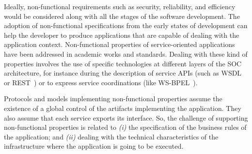 Ideally, non-functional requirements such as
security, reliability, and efficiency
would be considered along with all the stages of the software development. The
adoption of non-functional specifications from the early states of development
can help the developer to produce applications that are capable of dealing with
the application context.
%
%
Non-functional properties of service-oriented applications  have been
addressed in academic works and standards. %
Dealing with these kind of properties involves the use of specific technologies
at different layers of the SOC architecture, for instance during the description
of service APIs (such as WSDL\cite{wsdl} or REST~\cite{rest}) or to express
service coordinations (like WS-BPEL~\cite{bpel03}).


Protocols and models implementing non-functional properties assume the existence of a global control of the artifacts implementing the application.
They also assume that each service exports its interface.
So, the challenge of supporting non-functional properties is related to
\textit{(i)} the specification of the business rules of the application; and 
\textit{(ii)} dealing with the technical characteristics of the infrastructure where the application is  going to be executed.

